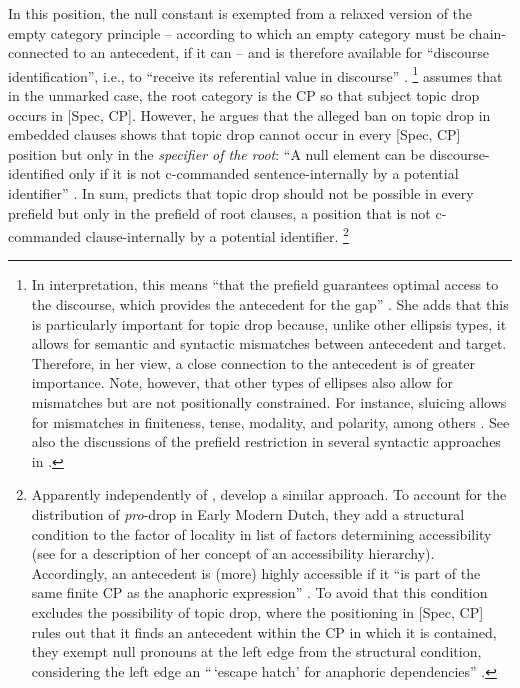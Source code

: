 %
In this position, the null constant is exempted from a relaxed version of the empty category principle \citep[in the sense of][]{rizzi1990} -- according to which an empty category must be chain-connected to an antecedent,  if it can -- and is therefore available for ``discourse identification'', i.e., to ``receive its referential value in discourse'' \citep[162]{rizzi1994}.%
\footnote{In  interpretation, this means ``that the prefield guarantees optimal access to the discourse, which provides the antecedent  for the gap'' \citep[19]{trutkowski2016}.
She adds that this is particularly important for topic drop because, unlike other ellipsis types, it allows for semantic and syntactic mismatches between antecedent  and target.
Therefore, in her view, a close connection to the antecedent  is of greater importance.
Note, however, that other types of ellipses also allow for mismatches but are not positionally constrained.
For instance, sluicing  \citep[e.g.,][]{ross1969,merchant2001} allows for mismatches in finiteness, tense, modality, and polarity, among others \citep[see, e.g.,][]{kroll.rudin2017,anand.etal2021}.
See also the discussions of the prefield restriction in several syntactic approaches in .}
\largerpage[2]
\citet{rizzi1994} assumes that in the unmarked case, the root category is the CP  so that subject topic drop occurs in [Spec, CP].
However, he argues that the alleged ban on topic drop in embedded clauses shows that topic drop cannot occur in every [Spec, CP] position but only in the \textit{specifier of the root}:
``A null element can be discourse-identified only if it is not c-commanded sentence-internally by a potential identifier'' \citep[169]{rizzi1994}.
In sum, \citet{rizzi1994} predicts that topic drop should not be possible in every prefield but only in the prefield of root clauses, a position that is not c-commanded  clause-internally by a potential identifier.%
\footnote{\label{note:ackema}Apparently independently of \citet{rizzi1994}, \citet{ackema.neeleman2007} develop a similar approach.
To account for the distribution of \textit{pro}-drop  in Early Modern Dutch,  they add a structural condition to the factor of locality in  list of factors determining accessibility (see  for a description of her concept of an accessibility hierarchy).
Accordingly, an antecedent  is (more) highly accessible if it ``is part of the same finite CP  as the anaphoric expression'' \citep[97]{ackema.neeleman2007}.
To avoid that this condition excludes the possibility of topic drop, where the positioning in [Spec, CP] rules out that it finds an antecedent  within the CP  in which it is contained, they exempt null pronouns at the left edge from the structural condition, considering the left edge an ``\,`escape hatch' for anaphoric dependencies'' \citep[99]{ackema.neeleman2007}.}

